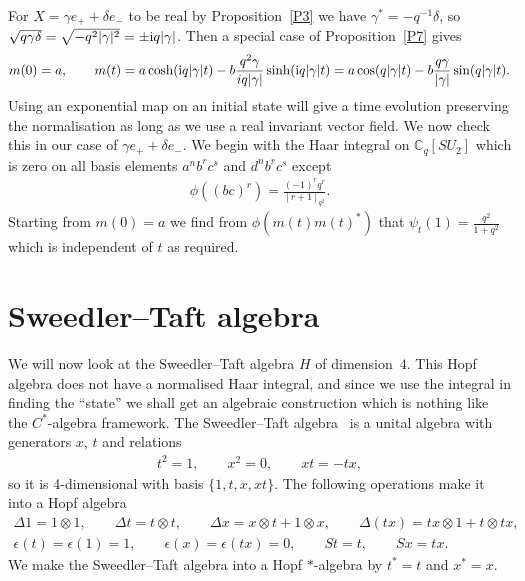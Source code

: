\documentclass[10pt,a4paper]{amsart}
\numberwithin{equation}{section}
\newcommand{\tens}{\mathop{\otimes}}
\newcommand{\C}{\mathbb{C}}
\newcommand{\<}{\langle}
\renewcommand{\>}{\rangle}
\begin{document}
\begin{Example}
	For $ X= \gamma e_{+} + \delta e_{-} $ to be real by Proposition~\ref{P3} we have $ \gamma^{*} =-q^{-1} \delta $, so $ \sqrt{q \gamma \delta}=\sqrt{-q^{2}| \gamma|^{2}} =\pm {\rm i} q | \gamma|$. Then a special case of Proposition~\ref{P7} gives
\begin{gather*}%
	m(0)=a, \qquad m(t)	=a \cosh ({\rm i} q | \gamma|t)-b\frac{q^{2}\gamma}{i q | \gamma|} \sinh ({\rm i} q | \gamma|t)= a \cos (q | \gamma|t)-b\frac{ q \gamma } {| \gamma |} \sin (q | \gamma|t).
\end{gather*}
Using an exponential map on an initial state will give a time evolution preserving the normalisation as long as we use a real invariant vector field. We now check this in our case of $ \gamma e_{+}+ \delta e_{-} $. We begin with the Haar integral on $ \C_{q}[SU_{2}] $ which is zero on all basis elements $ a^{n} b^{r} c^{s} $ and $ d^{n} b^{r} c^{s} $ except
\begin{align*}
	\phi ((bc)^{r})=\frac{(-1)^{r}q^{r}}{[r+1]_{q^{2}}}.
\end{align*}
Starting from $ m(0)=a $ we find from $ \phi(m(t) m(t)^{*}) $ that $ \psi_{t}(1)=\frac{q^{2}}{1+q^{2}} $ which is independent of $ t $ as required.
\end{Example}

\section[Sweedler-Taft algebra]{Sweedler--Taft algebra}
We will now look at the Sweedler--Taft algebra $ H $ of dimension~$ 4 $. This Hopf algebra does not have a normalised Haar integral, and since we use the integral in finding the ``state'' we shall get an algebraic construction which is nothing like the $ C^{*} $-algebra framework. The Sweedler--Taft algebra~\cite{Taft} is a unital algebra with generators $ x$, $t $ and relations
\begin{gather*}
		t^{2}=1,\qquad x^{2}=0, \qquad xt=-tx,
\end{gather*}
so it is 4-dimensional with basis $ \{1,t,x,xt\} $. The following operations make it into a Hopf algebra
	\begin{gather*}
		\Delta 1 =1 \tens 1, \qquad\Delta t= t \tens t, \qquad \Delta x = x \tens t + 1 \tens x, \qquad \Delta(t x)= t x \tens 1 + t \tens tx,\\ \epsilon(t)=\epsilon(1)=1, \qquad \epsilon(x)=\epsilon(t x)=0, \qquad St=t, \qquad Sx= t x.
	\end{gather*}
We make the Sweedler--Taft algebra into a Hopf $ * $-algebra by $ t^{*} =t$ and $ x^{*}= x $.
\end{document}
